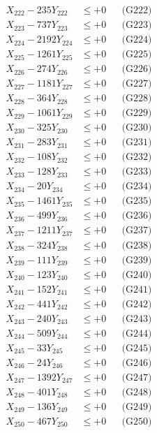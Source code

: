 \documentclass[a4paper,10pt]{article}
\begin{document}
{\begin{align}
X_{222} - 235Y_{222} &\leq +0 && \text{(G222)} \\
X_{223} - 737Y_{223} &\leq +0 && \text{(G223)} \\
X_{224} - 2192Y_{224} &\leq +0 && \text{(G224)} \\
X_{225} - 1261Y_{225} &\leq +0 && \text{(G225)} \\
X_{226} - 274Y_{226} &\leq +0 && \text{(G226)} \\
X_{227} - 1181Y_{227} &\leq +0 && \text{(G227)} \\
X_{228} - 364Y_{228} &\leq +0 && \text{(G228)} \\
X_{229} - 1061Y_{229} &\leq +0 && \text{(G229)} \\
X_{230} - 325Y_{230} &\leq +0 && \text{(G230)} \\
\allowbreak
X_{231} - 283Y_{231} &\leq +0 && \text{(G231)} \\
X_{232} - 108Y_{232} &\leq +0 && \text{(G232)} \\
X_{233} - 128Y_{233} &\leq +0 && \text{(G233)} \\
X_{234} - 20Y_{234} &\leq +0 && \text{(G234)} \\
X_{235} - 1461Y_{235} &\leq +0 && \text{(G235)} \\
X_{236} - 499Y_{236} &\leq +0 && \text{(G236)} \\
X_{237} - 1211Y_{237} &\leq +0 && \text{(G237)} \\
X_{238} - 324Y_{238} &\leq +0 && \text{(G238)} \\
X_{239} - 111Y_{239} &\leq +0 && \text{(G239)} \\
X_{240} - 123Y_{240} &\leq +0 && \text{(G240)} \\
\allowbreak
X_{241} - 152Y_{241} &\leq +0 && \text{(G241)} \\
X_{242} - 441Y_{242} &\leq +0 && \text{(G242)} \\
X_{243} - 240Y_{243} &\leq +0 && \text{(G243)} \\
X_{244} - 509Y_{244} &\leq +0 && \text{(G244)} \\
X_{245} - 33Y_{245} &\leq +0 && \text{(G245)} \\
X_{246} - 24Y_{246} &\leq +0 && \text{(G246)} \\
X_{247} - 1392Y_{247} &\leq +0 && \text{(G247)} \\
X_{248} - 401Y_{248} &\leq +0 && \text{(G248)} \\
X_{249} - 136Y_{249} &\leq +0 && \text{(G249)} \\
X_{250} - 467Y_{250} &\leq +0 && \text{(G250)} \\

\end{align}}
\end{document}
